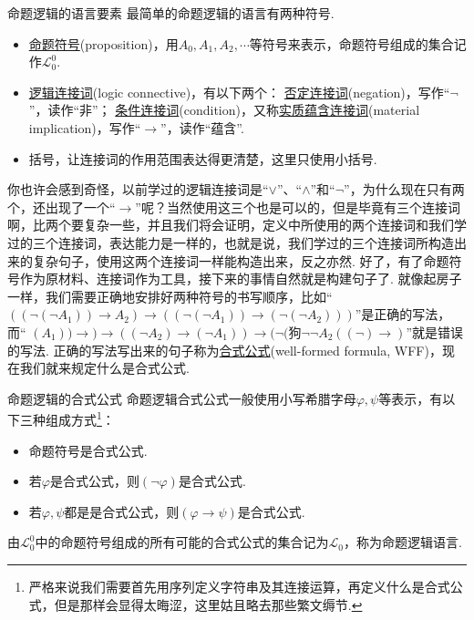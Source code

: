 \documentclass[main.tex]{subfiles}
\begin{document}
\begin{definition}{命题逻辑的语言要素}
    最简单的命题逻辑的语言有两种符号. 
    \begin{itemize}
        \item \uline{命题符号}(proposition)，用\(A_0, A_1, A_2, \cdots\)等符号来表示，命题符号组成的集合记作\(\mathcal{L}_0^0\).
        \item \uline{逻辑连接词}(logic connective)，有以下两个：\newline
            \uline{否定连接词}(negation)，写作“\(\neg\)”，读作“非”；\newline
            \uline{条件连接词}(condition)，又称\uline{实质蕴含连接词}(material implication)，写作“\(\to\)”，读作“蕴含”.
        \item 括号，让连接词的作用范围表达得更清楚，这里只使用小括号.
    \end{itemize}
\end{definition}

你也许会感到奇怪，以前学过的逻辑连接词是“\(\vee\)”、“\(\wedge\)”和“\(\neg\)”，为什么现在只有两个，还出现了一个“\(\to\)”呢？当然使用这三个也是可以的，但是毕竟有三个连接词啊，比两个要复杂一些，并且我们将会证明，定义中所使用的两个连接词和我们学过的三个连接词，表达能力是一样的，也就是说，我们学过的三个连接词所构造出来的复杂句子，使用这两个连接词一样能构造出来，反之亦然. 好了，有了命题符号作为原材料、连接词作为工具，接下来的事情自然就是构建句子了. 就像起房子一样，我们需要正确地安排好两种符号的书写顺序，比如“{\color{blue} \(((\neg(\neg A_1)) \to A_2) \to ((\neg(\neg A_1)) \to (\neg(\neg A_2)))\)}”是正确的写法，而“{\color{red} \((A_1)) \to ) \to ((\neg A_2) \to (\neg A_1)) \to (\neg(\mbox{狗}\neg\neg A_2 ((\neg ) \to)\)}”就是错误的写法. 正确的写法写出来的句子称为\uline{合式公式}(well-formed formula, WFF)，现在我们就来规定什么是合式公式.

\begin{definition}{命题逻辑的合式公式}
    命题逻辑合式公式一般使用小写希腊字母\(\varphi, \psi\)等表示，有以下三种组成方式\footnote{严格来说我们需要首先用序列定义字符串及其连接运算，再定义什么是合式公式，但是那样会显得太晦涩，这里姑且略去那些繁文缛节.}：
    \begin{itemize}
        \item 命题符号是合式公式. 
        \item 若\(\varphi\)是合式公式，则\((\neg \varphi)\)是合式公式.
        \item 若\(\varphi, \psi\)都是是合式公式，则\((\varphi \to \psi)\)是合式公式.
    \end{itemize}
    由\(\mathcal{L}_0^0\)中的命题符号组成的所有可能的合式公式的集合记为\(\mathcal{L}_0\)，称为命题逻辑语言.
\end{definition}
\end{document}

